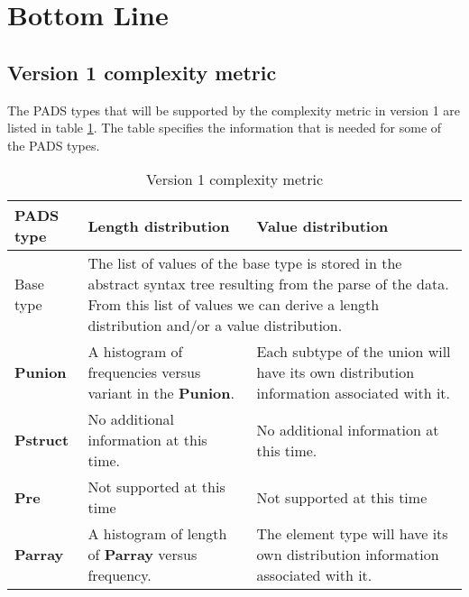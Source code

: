 \newpage
\section{Bottom Line}
\label{sec:BottomLine}

\subsection{Version 1 complexity metric}

The PADS types that will be supported by the complexity metric in
version 1 are listed in table \ref{tab:v1Complexity}. The table
specifies the information that is needed for some of the PADS types.

\begin{longtable}{||l|l|l|}
\caption[Version 1 complexity metric]{Version 1 complexity metric}
\label{tab:v1Complexity}
\\\hline
\hline
PADS type & Length distribution & Value distribution \\\hline\hline

Base type &
\multicolumn{2}{l}{
\parbox[t]{11cm}{
The list of values of the base type is stored in the abstract
syntax tree resulting from the parse of the data. From this
list of values we can derive a length distribution and/or
a value distribution.
\vspace{0.5mm}}} \vline\\\hline

\textbf{Punion} &
\parbox[t]{5cm}{
A histogram of frequencies versus variant in the \textbf{Punion}.
\vspace{0.5mm}} &
\parbox[t]{6cm}{
Each subtype of the union will have its own distribution information
associated with it.
\vspace{0.5mm}} \\\hline

\textbf{Pstruct} &
\parbox[t]{5cm}{
No additional information at this time.
\vspace{0.5mm}} &
\parbox[t]{6cm}{
No additional information at this time.
\vspace{0.5mm}} \\\hline

\textbf{Pre} &
\parbox[t]{5cm}{
Not supported at this time
\vspace{0.5mm}} &
\parbox[t]{6cm}{
Not supported at this time
\vspace{0.5mm}} \\\hline

\textbf{Parray} &
\parbox[t]{5cm}{
A histogram of length of \textbf{Parray} versus frequency.
\vspace{0.5mm}} &
\parbox[t]{6cm}{
The element type will have its own distribution information
associated with it.
\vspace{0.5mm}}

\\\hline
\end{longtable}

